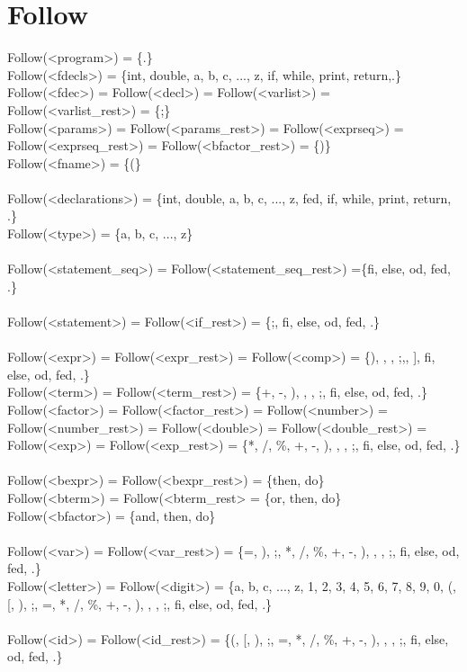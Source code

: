 \documentclass{article}
\begin{document}
\section*{Follow}

Follow(<program>) = \{.\}\\
Follow(<fdecls>) = \{int, double, a, b, c, ..., z, if, while, print, return,.\}\\
Follow(<fdec>) = Follow(<decl>) = Follow(<varlist>) = Follow(<varlist\_rest>) = \{;\}\\
Follow(<params>) = Follow(<params\_rest>) = Follow(<exprseq>) = Follow(<exprseq\_rest>) = Follow(<bfactor\_rest>) = \{)\}\\
Follow(<fname>) = \{(\}\\
\\
Follow(<declarations>) = \{int, double, a, b, c, ..., z, fed, if, while, print, return, .\}\\
Follow(<type>) = \{a, b, c, ..., z\}\\
\\
Follow(<statement\_seq>) = Follow(<statement\_seq\_rest>) =\{fi, else, od, fed, .\}\\
\\
Follow(<statement>) = Follow(<if\_rest>) = \{;, fi, else, od, fed, .\}\\
\\
Follow(<expr>) = Follow(<expr\_rest>) = Follow(<comp>) = \{), , , ;,, ], fi, else, od, fed, .\}\\
Follow(<term>) = Follow(<term\_rest>) = \{+, -, ), , , ;, fi, else, od, fed, .\}\\
Follow(<factor>) = Follow(<factor\_rest>) = Follow(<number>) = Follow(<number\_rest>) = Follow(<double>) = Follow(<double\_rest>) = Follow(<exp>) = Follow(<exp\_rest>) = \{*, /, \%, +, -, ), , , ;, fi, else, od, fed, .\}\\
\\
Follow(<bexpr>) = Follow(<bexpr\_rest>) = \{then, do\}\\
Follow(<bterm>) = Follow(<bterm\_rest> = \{or, then, do\}\\
Follow(<bfactor>) = \{and, then, do\}\\
\\
Follow(<var>) = Follow(<var\_rest>) = \{=, ), ;, *, /, \%, +, -, ), , , ;, fi, else, od, fed, .\}\\
Follow(<letter>) = Follow(<digit>) = \{a, b, c, ..., z, 1, 2, 3, 4, 5, 6, 7, 8, 9, 0, (, [, ), ;, =, *, /, \%, +, -, ), , , ;, fi, else, od, fed, .\}\\
\\
Follow(<id>) = Follow(<id\_rest>) = \{(, [, ), ;, =, *, /, \%, +, -, ), , , ;, fi, else, od, fed, .\}\\
\end{document}
